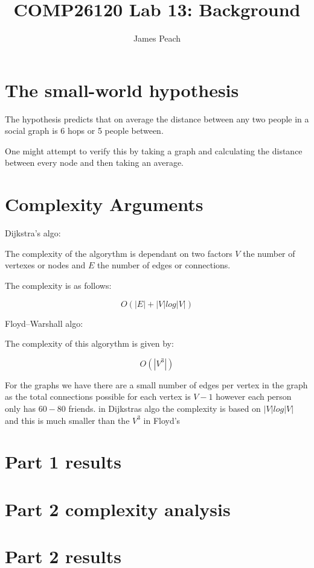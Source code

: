 \documentclass{article}
\title{COMP26120 Lab 13: Background}
\author{James Peach}
\begin{document}
\maketitle


\section{The small-world hypothesis}
\label{sec:small world}

The hypothesis predicts that on average the distance between any two people in
a social graph is 6 hops or 5 people between.

One might attempt to verify this by taking a graph and calculating the distance
between every node and then taking an average.


\section{Complexity Arguments}
\label{sec:complexity}

Dijkstra's algo:

The complexity of the algorythm is dependant on two factors $V$ the number of 
vertexes or nodes and $E$ the number of edges or connections.

The complexity is as follows:

$$O(|E| + |V|log|V|)$$

Floyd–Warshall algo:

The complexity of this algorythm is given by:

$$O(|V^3|)$$

For the graphs we have there are a small number of edges per vertex in the
graph as the total connections possible for each vertex is $V-1$ however each
person only has $60-80$ friends. in Dijkstras algo the complexity is based on 
$|V|log|V|$ and this is much smaller than the $V^3$ in Floyd's

\section{Part 1 results}
\label{sec:part1}



\section{Part 2 complexity analysis}
\label{sec:complexity2}


\section{Part 2 results}
\label{sec:part2}
\end{document}

